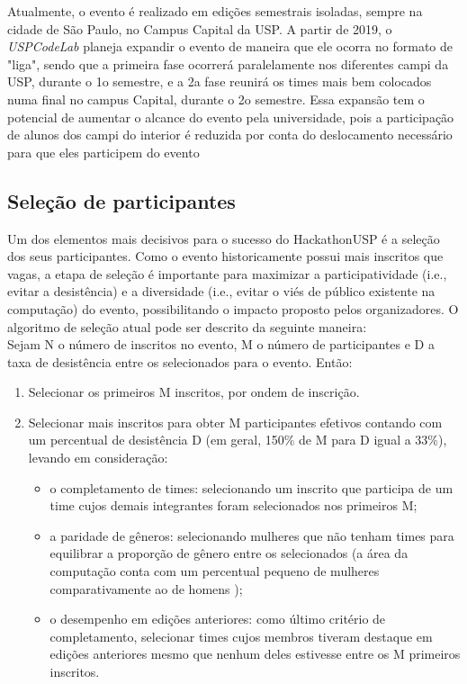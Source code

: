 \documentclass[10pt,twoside,a4paper]{article}
\begin{document}
    Atualmente, o evento é realizado em edições semestrais isoladas, sempre na cidade de São Paulo, no Campus Capital da USP. A partir de 2019, o \textit{USPCodeLab} planeja expandir o evento de maneira que ele ocorra no formato de "liga", sendo que a primeira fase ocorrerá paralelamente nos diferentes campi da USP, durante o 1o semestre, e a 2a fase reunirá os times mais bem colocados numa final no campus Capital, durante o 2o semestre. Essa expansão tem o potencial de aumentar o alcance do evento pela universidade, pois a participação de alunos dos campi do interior é reduzida por conta do deslocamento necessário para que eles participem do evento
    
  \subsection{Seleção de participantes}
    
    Um dos elementos mais decisivos para o sucesso do HackathonUSP é a seleção dos seus participantes. Como o evento historicamente possui mais inscritos que vagas, a etapa de seleção é importante para maximizar a participatividade (i.e., evitar a desistência) e a diversidade (i.e., evitar o viés de público existente na computação) do evento, possibilitando o impacto proposto pelos organizadores.
    O algoritmo de seleção atual pode ser descrito da seguinte maneira: \\
    
    
    Sejam N o número de inscritos no evento, M o número de participantes e D a taxa de desistência entre os selecionados para o evento. Então:
    
    \begin{enumerate}
      \item Selecionar os primeiros M inscritos, por ondem de inscrição.
     
      \item Selecionar mais inscritos para obter M participantes efetivos contando com um percentual de desistência D (em geral, 150\% de M para D igual a 33\%), levando em consideração: 
      
      \begin{itemize}
          \item o completamento de times: selecionando um inscrito que participa de um time cujos demais integrantes foram selecionados nos primeiros M;
          \item a paridade de gêneros: selecionando mulheres que não tenham times para equilibrar a proporção de gênero entre os selecionados (a área da computação conta com um percentual pequeno de mulheres comparativamente ao de homens \cite{Frenkel1990WomenComputing});
          \item o desempenho em edições anteriores: como último critério de completamento, selecionar times cujos membros tiveram destaque em edições anteriores mesmo que nenhum deles estivesse entre os M primeiros inscritos.
      \end{itemize}   
    \end{enumerate}
    
\end{document}
